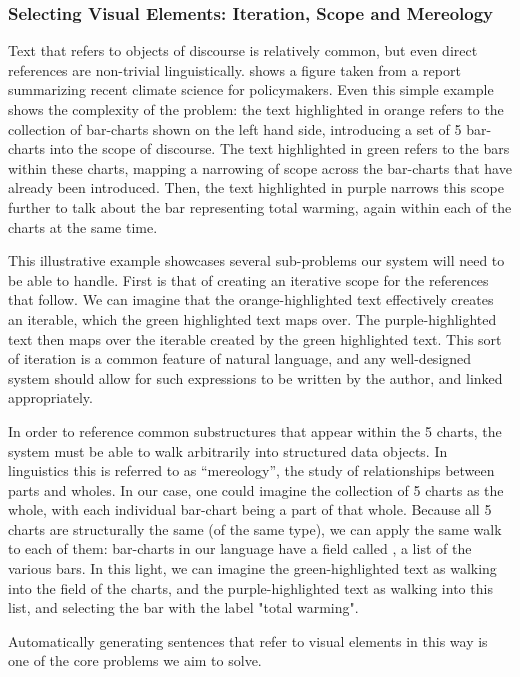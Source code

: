 \subsubsection{Selecting Visual Elements: Iteration, Scope and Mereology}
Text that refers to objects of discourse is relatively common, but even direct references are non-trivial 
linguistically.  shows a figure taken from a report summarizing recent climate 
science for policymakers. Even this simple example shows the complexity of the problem: the text highlighted
in orange refers to the collection of bar-charts shown on the left hand side, introducing a set of 5 bar-charts
into the scope of discourse. The text highlighted in green refers to the bars within these charts, mapping 
a narrowing of scope across the bar-charts that have already been introduced. Then, the text highlighted in
purple narrows this scope further to talk about the bar representing total warming, again within each of the
charts at the same time. 

This illustrative example showcases several sub-problems our system will need to be able to handle. First
is that of creating an iterative scope for the references that follow. We can imagine that the orange-highlighted
text effectively creates an iterable, which the green highlighted text maps over. The purple-highlighted text
then maps over the iterable created by the green highlighted text. This sort of iteration is a common feature of natural language,
and any well-designed system should allow for such expressions to be written by the author, and linked appropriately.

In order to reference common substructures that appear within the 5 charts, the system must be able to walk arbitrarily 
into structured data objects. In linguistics this is referred to as ``mereology'', the study of relationships
between parts and wholes. In our case, one could imagine the collection of 5 charts as the whole, with each
individual bar-chart being a part of that whole. Because all 5 charts are structurally the same (of the same type),
we can apply the same walk to each of them: bar-charts in our language have a field called , a list
of the various bars. In this light, we can imagine the green-highlighted text as walking into the  field
of the charts, and the purple-highlighted text as walking into this list, and selecting the bar with the label "total warming".

Automatically generating sentences that refer to visual elements in this way is one of the core problems we aim to solve.

